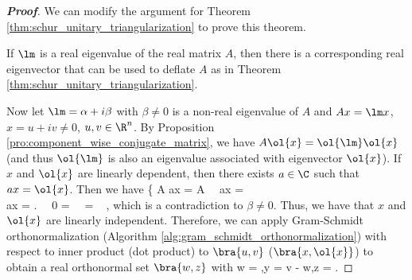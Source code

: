 \begin{proof}[\bf Proof]
We can modify the argument for Theorem \ref{thm:schur_unitary_triangularization} to prove this theorem.

If $\lm$ is a real eigenvalue of the real matrix $A$, then there is a corresponding real eigenvector that can be used to deflate $A$ as in Theorem \ref{thm:schur_unitary_triangularization}.

Now let $\lm = \alpha + i\beta$ with $\beta \neq 0$ is a non-real eigenvalue of $A$ and $Ax = \lm x$, $x = u + iv\neq 0$, $u,v\in \R^n$. By Proposition \ref{pro:component_wise_conjugate_matrix}, we have $A\ol{x} =
\ol{\lm} \ol{x}$ (and thus $\ol{\lm}$ is also an eigenvalue associated with eigenvector $\ol{x}$). If $x$ and $\ol{x}$ are linearly dependent, then there exists $a\in \C$ such that $ax = \ol{x}$. Then we have
\be
\left\{
A ax = A \ \ra \ a\lm x = \ol{\lm} \\
a\lm x = \lm {} \ea\right.  \ \ra \ 0 = \bb{\lm - \ol{\lm}} \ \ra \ \lm = \ol{\lm} \quad {}\  ,
\ee
which is a contradiction to $\beta \neq 0$. Thus, we have that $x$ and $\ol{x}$ are linearly independent. Therefore, we can apply Gram-Schmidt orthonormalization (Algorithm
\ref{alg:gram_schmidt_orthonormalization}) with respect to inner product (dot product) to $\bra{u,v}$ ($\bra{x,\ol{x}}$) to obtain a real orthonormal set $\bra{w,z}$ with
\be
w = ,\quad y = v - w,\quad z = .   %
\ee


\end{proof}
